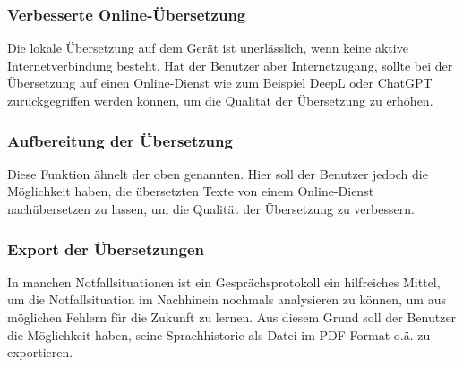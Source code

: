 \subsubsection{Verbesserte Online-Übersetzung}
Die lokale Übersetzung auf dem Gerät ist unerlässlich, wenn keine aktive Internetverbindung besteht. Hat der Benutzer aber Internetzugang, sollte bei der Übersetzung auf einen Online-Dienst wie zum Beispiel DeepL oder ChatGPT zurückgegriffen werden können, um die Qualität der Übersetzung zu erhöhen.

\subsubsection{Aufbereitung der Übersetzung}
Diese Funktion ähnelt der oben genannten. Hier soll der Benutzer jedoch die Möglichkeit haben, die übersetzten Texte von einem Online-Dienst nachübersetzen zu lassen, um die Qualität der Übersetzung zu verbessern. 

\subsubsection{Export der Übersetzungen}
In manchen Notfallsituationen ist ein Gesprächsprotokoll ein hilfreiches Mittel, um die Notfallsituation im Nachhinein nochmals analysieren zu können, um aus möglichen Fehlern für die Zukunft zu lernen. Aus diesem Grund soll der Benutzer die Möglichkeit haben, seine Sprachhistorie als Datei im PDF-Format o.ä. zu exportieren.
